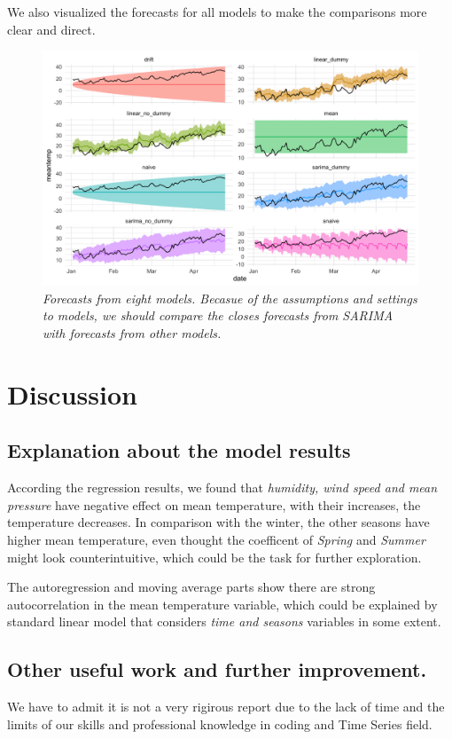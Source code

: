 \documentclass[12pt]{article}
\begin{document}
We also visualized the forecasts for all models to make the comparisons more
clear and direct.
\begin{figure}[!h]
    \centering
    \includegraphics[width=.8\textwidth]{images/forecasts_CI90.png}
    \captionsetup{font=small} %
    \caption{\textit{Forecasts from eight models. 
    Becasue of the assumptions and settings to models,
    we should compare the closes forecasts from SARIMA with forecasts
    from other models.}}
    \label{fig:figure1}
\end{figure}

\section{Discussion}
\subsection{Explanation about the model results}
According the regression results, we found that \textit{humidity, wind speed and mean pressure} have
negative effect on mean temperature, with their increases, the temperature decreases.
In comparison with the winter, the other seasons have higher mean temperature, 
even thought the coefficent of \textit{Spring} and \textit{Summer} might look counterintuitive, 
which could be the task for further exploration.

The autoregression and moving average parts show there are strong autocorrelation
in the mean temperature variable, which could be explained by standard linear model
that considers \textit{time and seasons} variables in some extent.

\subsection{Other useful work and further improvement.}
We have to admit it is not a very rigirous report due to the lack of time and 
the limits of our skills and professional knowledge in coding and Time Series field.
\end{document}
